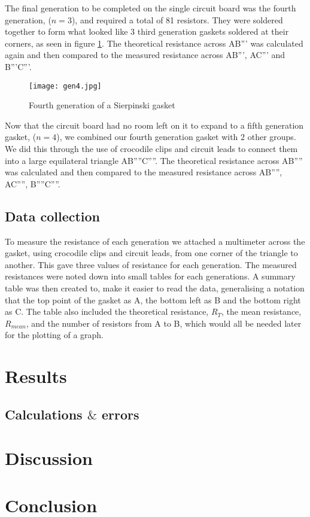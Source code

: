 \documentclass[11pt,a4paper,twocolumn]{paper}
\begin{document}
The final generation to be completed on the single circuit board was the fourth generation, ($n=3$), and required a total of 81 resistors. They were soldered together to form what looked like 3 third generation gaskets soldered at their corners, as seen in figure \ref{figure 4}. The theoretical resistance across AB''' was calculated again and then compared to the measured resistance across AB''', AC''' and B'''C'''.

\begin{figure}[htb]
\centering
\texttt{[image: gen4.jpg]}
\caption{Fourth generation of a Sierpinski gasket}
\label{figure 4}
\end{figure}

Now that the circuit board had no room left on it to expand to a fifth generation gasket, ($n=4$), we combined our fourth generation gasket with 2 other groups. We did this through the use of crocodile clips and circuit leads to connect them into a large equilateral triangle AB''''C''''. The theoretical resistance across AB'''' was calculated and then compared to the measured resistance across AB'''', AC'''', B''''C''''.

\subsection*{Data collection}

To measure the resistance of each generation we attached a multimeter across the gasket, using crocodile clips and circuit leads, from one corner of the triangle to another. This gave three values of resistance for each generation. The measured resistances were noted down into small tables for each generations. A summary table was then created to, make it easier to read the data, generalising a notation that the top point of the gasket as A, the bottom left as B and the bottom right as C. The table also included the theoretical resistance, $R_T$, the mean resistance, $R_{mean}$, and the number of resistors from A to B, which would all be needed later for the plotting of a graph.

\section*{Results}
\subsection*{Calculations $\&$ errors}
\section*{Discussion}
\section*{Conclusion}
\end{document}
